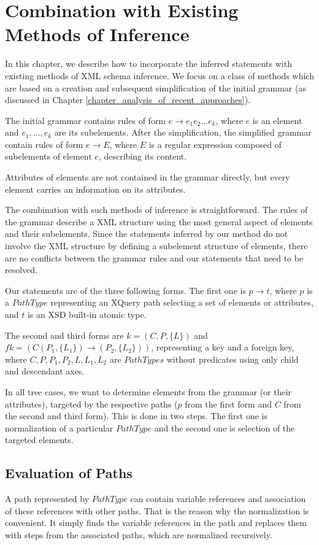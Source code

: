 \chapter{Combination with Existing Methods of Inference}

In this chapter, we describe how to incorporate the inferred statements with existing methods of XML schema inference. We focus on a class of methods which are based on a creation and subsequent simplification of the initial grammar (as discussed in Chapter \ref{chapter_analysis_of_recent_approaches}).

The initial grammar contains rules of form $e \rightarrow e_1e_2\dots e_k$, where $e$ is an element and $e_1, \dots , e_k$ are its subelements. After the simplification, the simplified grammar contain rules of form $e \rightarrow E$, where $E$ is a regular expression composed of subelements of element $e$, describing its content.

Attributes of elements are not contained in the grammar directly, but every element carries an information on its attributes.

The combination with such methods of inference is straightforward. The rules of the grammar describe a XML structure using the most general aspect of elements and their subelements. Since the statements inferred by our method do not involve the XML structure by defining a subelement structure of elements, there are no conflicts between the grammar rules and our statements that need to be resolved.

Our statements are of the three following forms. The first one is $p \rightarrow t$, where $p$ is a $PathType$ representing an XQuery path selecting a set of elements or attributes, and $t$ is an XSD built-in atomic type.

The second and third forms are $k = (C,P,\{L\})$ and $fk = (C(P_1,\{L_1\}) \rightarrow (P_2,\{L_2\}))$, representing a key and a foreign key, where $C,P,P_1,P_2,L,L_1,L_2$ are $PathTypes$ without predicates using only child and descendant axes.

In all tree cases, we want to determine elements from the grammar (or their attributes), targeted by the respective paths ($p$ from the first form and $C$ from the second and third form). This is done in two steps. The first one is normalization of a particular $PathType$ and the second one is selection of the targeted elements.

\section{Evaluation of Paths}
A path represented by $PathType$ can contain variable references and association of these references with other paths. That is the reason why the normalization is convenient. It simply finds the variable references in the path and replaces them with steps from the associated paths, which are normalized recursively.

